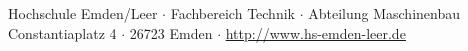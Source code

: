 \begin{titlepage}
  	\vspace{3cm}
    \small
    \begin{center}
        Hochschule Emden/Leer $\cdot$ 
        Fachbereich Technik $\cdot$ 
        Abteilung Maschinenbau \\
        Constantiaplatz 4 $\cdot$ 
        26723 Emden $\cdot$ 
        \url{http://www.hs-emden-leer.de}
    \end{center}
    
\end{titlepage}
